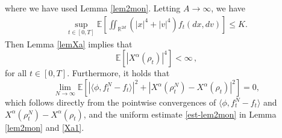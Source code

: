 \documentclass{ims9x6}
\newcommand{\R}{{\mathbb R}}
\newcommand{\EE}{\mathbb{E}}
\newcommand{\la}{\langle}
\newcommand{\ra}{\rangle}
\begin{document}
where we have used Lemma \ref{lem2mon}. Letting $A\rightarrow \infty$, we have 
\begin{align}
\sup_{t\in[0,T]}\EE\left[\iint_{\R^{2d}}(|x|^4+|v|^4)f_t(dx,dv)\right]\leq K. \label{bd-mu}
\end{align}
Then Lemma \ref{lemXa} implies that
\begin{equation}\label{Xa1}
\EE[|X^\alpha(\rho_t)|^4]<\infty\,,
\end{equation}
for all $t\in[0,T]$.
Furthermore, it holds that 
\begin{equation}\label{convergence}
\lim_{N\rightarrow \infty} 
\EE\left[
\left|\la \phi,f_t^N-f_t\ra \right|^2 + |X^\alpha(\rho^N_t)-X^\alpha(\rho_t)|^2
\right]=0,
\end{equation}
which follows directly from the pointwise convergences of $\la \phi,f_t^N-f_t\ra$ and $X^\alpha(\rho^N_t)-X^\alpha(\rho_t)$, and the uniform estimate \eqref{est-lem2mon} in Lemma \ref{lem2mon} and \eqref{Xa1}. 
\end{document}
